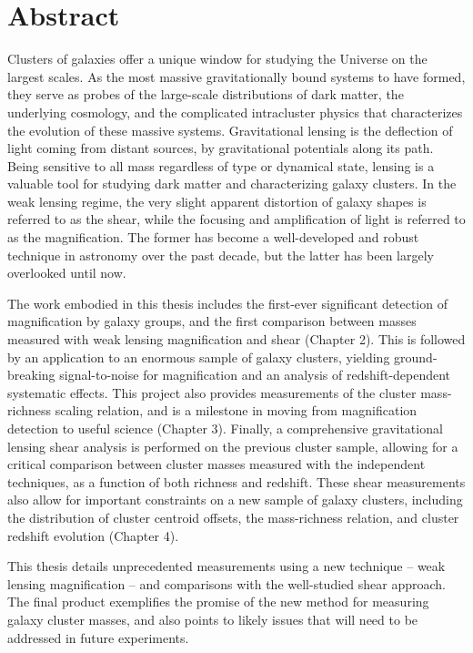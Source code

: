 
\chapter{Abstract}

Clusters of galaxies offer a unique window for studying the Universe on the largest scales. As the most massive gravitationally bound systems to have formed, they serve as probes of the large-scale distributions of dark matter, the underlying cosmology, and the complicated intracluster physics that characterizes the evolution of these massive systems. Gravitational lensing is the deflection of light coming from distant sources, by gravitational potentials along its path. Being sensitive to all mass regardless of type or dynamical state, lensing is a valuable tool for studying dark matter and characterizing galaxy clusters. In the weak lensing regime, the very slight apparent distortion of galaxy shapes is referred to as the shear, while the focusing and amplification of light is referred to as the magnification. The former has become a well-developed and robust technique in astronomy over the past decade, but the latter has been largely overlooked until now.

The work embodied in this thesis includes the first-ever significant detection of magnification by galaxy groups, and the first comparison between masses measured with weak lensing magnification and shear (Chapter 2). This is followed by an application to an enormous sample of galaxy clusters, yielding ground-breaking signal-to-noise for magnification and an analysis of redshift-dependent systematic effects. This project also provides measurements of the cluster mass-richness scaling relation, and is a milestone in moving from magnification detection to useful science (Chapter 3). Finally, a comprehensive gravitational lensing shear analysis is performed on the previous cluster sample, allowing for a critical comparison between cluster masses measured with the independent techniques, as a function of both richness and redshift. These shear measurements also allow for important constraints on a new sample of galaxy clusters, including the distribution of cluster centroid offsets, the mass-richness relation, and cluster redshift evolution (Chapter 4). 

This thesis details unprecedented measurements using a new technique -- weak lensing magnification -- and comparisons with the well-studied shear approach. The final product exemplifies the promise of the new method for measuring galaxy cluster masses, and also points to likely issues that will need to be addressed in future experiments.



